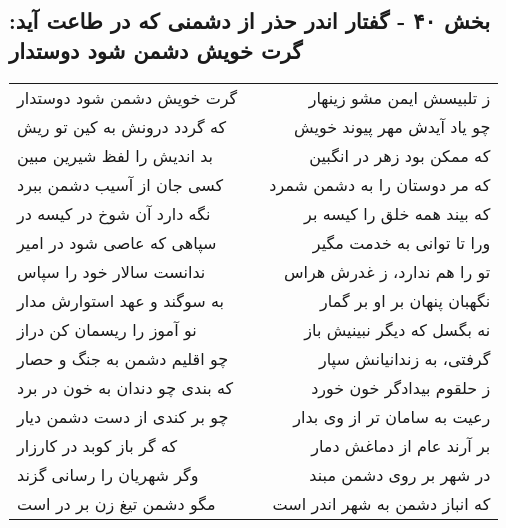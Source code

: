 \begin{center}
\section*{بخش ۴۰ - گفتار اندر حذر از دشمنی که در طاعت آید: گرت خویش دشمن شود دوستدار}
\label{sec:040}
\begin{longtable}{l p{0.5cm} r}
گرت خویش دشمن شود دوستدار
&&
ز تلبیسش ایمن مشو زینهار
\\
که گردد درونش به کین تو ریش
&&
چو یاد آیدش مهر پیوند خویش
\\
بد اندیش را لفظ شیرین مبین
&&
که ممکن بود زهر در انگبین
\\
کسی جان از آسیب دشمن ببرد
&&
که مر دوستان را به دشمن شمرد
\\
نگه دارد آن شوخ در کیسه در
&&
که بیند همه خلق را کیسه بر
\\
سپاهی که عاصی شود در امیر
&&
ورا تا توانی به خدمت مگیر
\\
ندانست سالار خود را سپاس
&&
تو را هم ندارد، ز غدرش هراس
\\
به سوگند و عهد استوارش مدار
&&
نگهبان پنهان بر او بر گمار
\\
نو آموز را ریسمان کن دراز
&&
نه بگسل که دیگر نبینیش باز
\\
چو اقلیم دشمن به جنگ و حصار
&&
گرفتی، به زندانیانش سپار
\\
که بندی چو دندان به خون در برد
&&
ز حلقوم بیدادگر خون خورد
\\
چو بر کندی از دست دشمن دیار
&&
رعیت به سامان تر از وی بدار
\\
که گر باز کوبد در کارزار
&&
بر آرند عام از دماغش دمار
\\
وگر شهریان را رسانی گزند
&&
در شهر بر روی دشمن مبند
\\
مگو دشمن تیغ زن بر در است
&&
که انباز دشمن به شهر اندر است
\\
\end{longtable}
\end{center}
